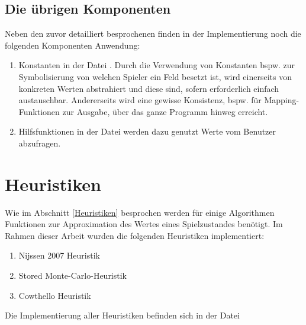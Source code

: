 \subsection{Die übrigen Komponenten}
Neben den zuvor detailliert besprochenen finden in der Implementierung noch die folgenden Komponenten Anwendung: 
\begin{enumerate}
\item Konstanten in der Datei . Durch die Verwendung von Konstanten bspw. zur Symbolisierung von welchen Spieler ein Feld besetzt ist, wird einerseits von konkreten Werten abstrahiert und diese sind, sofern erforderlich einfach austauschbar. Andererseits wird eine gewisse Konsistenz, bspw. für Mapping-Funktionen zur Ausgabe, über das ganze Programm hinweg erreicht.
\item Hilfsfunktionen in der Datei  werden dazu genutzt Werte vom Benutzer abzufragen.
\end{enumerate}
\section{Heuristiken}
\label{heuristic}
Wie im Abschnitt \ref{Heuristiken} besprochen werden für einige Algorithmen Funktionen zur Approximation des Wertes eines Spielzustandes benötigt. Im Rahmen dieser Arbeit wurden die folgenden Heuristiken implementiert:
\begin{enumerate}
\item Nijssen 2007 Heuristik
\item Stored Monte-Carlo-Heuristik
\item Cowthello Heuristik
\end{enumerate}
Die Implementierung aller Heuristiken befinden sich in der Datei 
